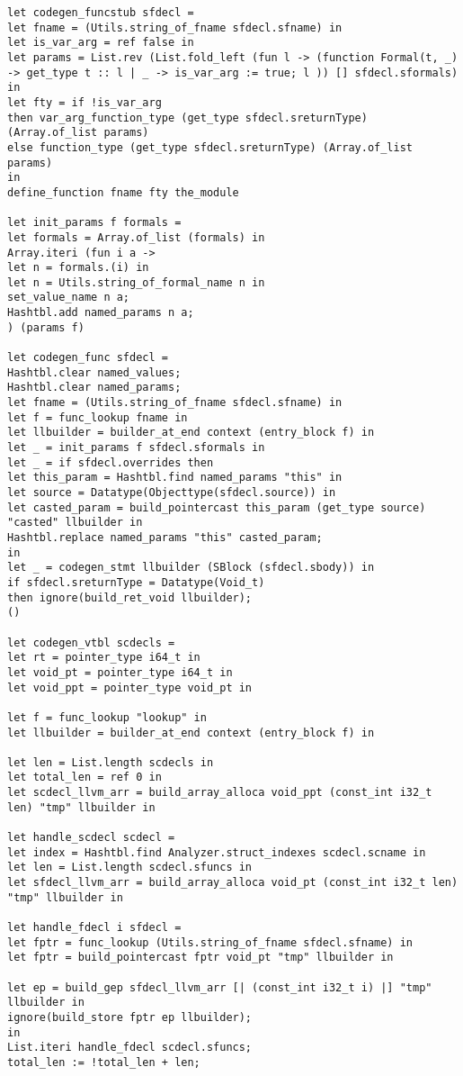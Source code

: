 \begin{verbatim}
let codegen_funcstub sfdecl = 
let fname = (Utils.string_of_fname sfdecl.sfname) in
let is_var_arg = ref false in
let params = List.rev (List.fold_left (fun l -> (function Formal(t, _) -> get_type t :: l | _ -> is_var_arg := true; l )) [] sfdecl.sformals) in
let fty = if !is_var_arg 
then var_arg_function_type (get_type sfdecl.sreturnType) (Array.of_list params)
else function_type (get_type sfdecl.sreturnType) (Array.of_list params) 
in
define_function fname fty the_module

let init_params f formals =
let formals = Array.of_list (formals) in
Array.iteri (fun i a ->
let n = formals.(i) in
let n = Utils.string_of_formal_name n in
set_value_name n a;
Hashtbl.add named_params n a;
) (params f)

let codegen_func sfdecl = 
Hashtbl.clear named_values;
Hashtbl.clear named_params;
let fname = (Utils.string_of_fname sfdecl.sfname) in
let f = func_lookup fname in
let llbuilder = builder_at_end context (entry_block f) in
let _ = init_params f sfdecl.sformals in 
let _ = if sfdecl.overrides then
let this_param = Hashtbl.find named_params "this" in
let source = Datatype(Objecttype(sfdecl.source)) in
let casted_param = build_pointercast this_param (get_type source) "casted" llbuilder in
Hashtbl.replace named_params "this" casted_param;
in
let _ = codegen_stmt llbuilder (SBlock (sfdecl.sbody)) in
if sfdecl.sreturnType = Datatype(Void_t) 
then ignore(build_ret_void llbuilder);
()

let codegen_vtbl scdecls = 
let rt = pointer_type i64_t in
let void_pt = pointer_type i64_t in
let void_ppt = pointer_type void_pt in

let f = func_lookup "lookup" in
let llbuilder = builder_at_end context (entry_block f) in

let len = List.length scdecls in
let total_len = ref 0 in
let scdecl_llvm_arr = build_array_alloca void_ppt (const_int i32_t len) "tmp" llbuilder in

let handle_scdecl scdecl = 
let index = Hashtbl.find Analyzer.struct_indexes scdecl.scname in
let len = List.length scdecl.sfuncs in
let sfdecl_llvm_arr = build_array_alloca void_pt (const_int i32_t len) "tmp" llbuilder in

let handle_fdecl i sfdecl = 
let fptr = func_lookup (Utils.string_of_fname sfdecl.sfname) in
let fptr = build_pointercast fptr void_pt "tmp" llbuilder in

let ep = build_gep sfdecl_llvm_arr [| (const_int i32_t i) |] "tmp" llbuilder in
ignore(build_store fptr ep llbuilder);
in 
List.iteri handle_fdecl scdecl.sfuncs;
total_len := !total_len + len;


\end{verbatim}

